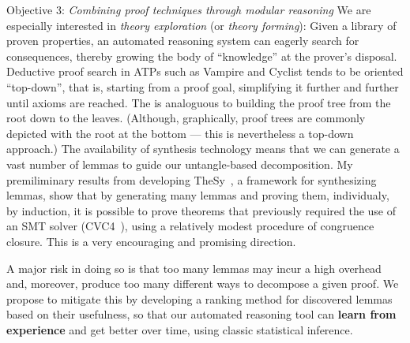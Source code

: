 \begin{paragraph}{Objective 3: {\it Combining proof techniques through modular reasoning}}
We are especially interested in \emph{theory exploration} (or \emph{theory forming}):
Given a library of proven properties, an automated reasoning system can eagerly search for consequences, thereby growing the body of ``knowledge'' at the prover's disposal.
Deductive proof search in ATPs such as Vampire and Cyclist tends to be oriented ``top-down'', that is,
starting from a proof goal, simplifying it further and further until axioms are reached.
The is analoguous to building the proof tree from the root down to the leaves. (Although, graphically, proof trees are commonly depicted with the root at the bottom --- this is nevertheless a top-down approach.)
The availability of synthesis technology \cite{JFP2017:Smallbone,ITP2017:Johansson,arXiv2020:Singher} means that we can generate a vast number of lemmas to guide our untangle-based decomposition.
My premiliminary results from developing TheSy~\cite{arXiv2020:Singher}, a framework for synthesizing lemmas, show that by generating many lemmas and proving them, individualy, by induction, it is possible to prove theorems that previously required the use of an SMT solver (CVC4~\cite{VMCAI2015:Reynolds}), using a relatively modest procedure of congruence closure.
This is a very encouraging and promising direction.

A major risk in doing so is that too many lemmas may incur a high overhead and, moreover, produce too many different ways to decompose a given proof.
We propose to mitigate this by developing a ranking method for discovered lemmas based on their usefulness,
so that our automated reasoning tool can \textbf{learn from experience} and get better over time, using classic statistical inference.
\end{paragraph}

